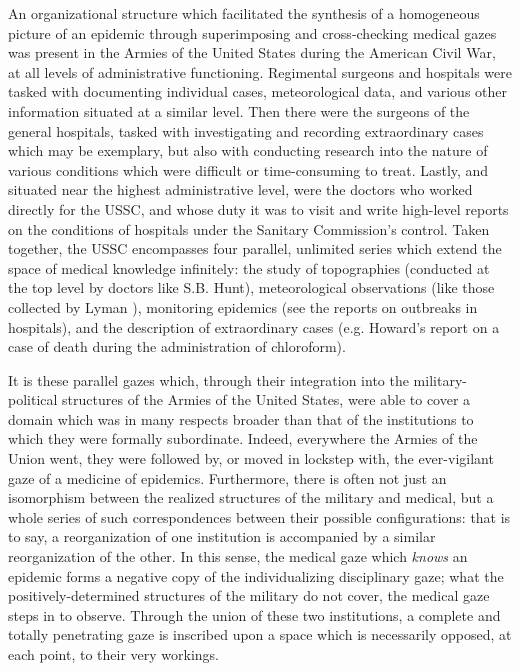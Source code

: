 \documentclass{report}
\begin{document}
  An organizational structure which facilitated the synthesis of a homogeneous picture of an epidemic through superimposing and cross-checking 
  medical gazes was present in the Armies of the United States during the American Civil War, at all levels of administrative functioning. Regimental
  surgeons and hospitals were tasked with documenting individual cases, meteorological data, and various other information situated at a similar
  level. Then there were the surgeons of the general hospitals, tasked with investigating and recording extraordinary cases which may be exemplary,
  but also with conducting research into the nature of various conditions which were difficult or time-consuming to treat. Lastly, and situated near
  the highest administrative level, were the doctors who worked directly for the USSC, and whose duty it was to visit and write high-level
  reports on the conditions of hospitals under the Sanitary Commission's control. Taken together, the USSC encompasses four parallel,
  unlimited series which extend the space of medical knowledge infinitely\autocite[pp.25]{Foucault1994}: the study of topographies 
  (conducted at the top level by doctors like S.B. Hunt\autocite{ussc:6:0990}), meteorological observations (like those collected by Lyman 
  \autocite{ussc:6:0112}), monitoring epidemics (see the reports on outbreaks in hospitals\autocite{ussc:9:1198}), and the description of extraordinary 
  cases (e.g. Howard's report on a case of death during the administration of chloroform\autocite{ussc:9:0388}).

  It is these parallel gazes which, through their integration into the military-political structures of the Armies of the United States, were able to cover
  a domain which was in many respects broader than that of the institutions to which they were formally subordinate. Indeed, everywhere the Armies
  of the Union went, they were followed by, or moved in lockstep with, the ever-vigilant gaze of a medicine of epidemics. Furthermore,
  there is often not just an isomorphism between the realized structures of the military and medical, but a whole series of such correspondences
  between their possible configurations: that is to say, a reorganization of one institution is accompanied by a similar reorganization of the
  other. In this sense, the medical gaze which \textit{knows} an epidemic forms a negative copy of the individualizing disciplinary gaze; what the
  positively-determined structures of the military do not cover, the medical gaze steps in to observe. Through the union of these two institutions,
  a complete and totally penetrating gaze is inscribed upon a space which is necessarily opposed, at each point, to their very workings.
\end{document}
